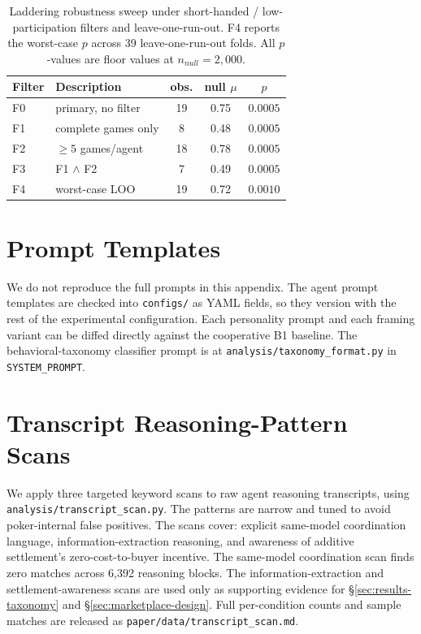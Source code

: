 \documentclass{article}
\begin{document}
\begin{table}[t]
    \centering
    \small
    \caption{Laddering robustness sweep under short-handed / low-participation filters and leave-one-run-out. F4 reports the worst-case $p$ across 39 leave-one-run-out folds. All $p$-values are floor values at $n_{null}{=}2{,}000$.}
    \label{tab:laddering-robustness}
    \begin{tabular}{llccc}
        \toprule
        Filter & Description & obs. & null $\mu$ & $p$ \\
        \midrule
        F0 & primary, no filter & 19 & 0.75 & $0.0005$ \\
        F1 & complete games only & 8 & 0.48 & $0.0005$ \\
        F2 & $\geq 5$ games/agent & 18 & 0.78 & $0.0005$ \\
        F3 & F1 $\wedge$ F2 & 7 & 0.49 & $0.0005$ \\
        F4 & worst-case LOO & 19 & 0.72 & $0.0010$ \\
        \bottomrule
    \end{tabular}
\end{table}

\section{Prompt Templates}
\label{app:prompts}

We do not reproduce the full prompts in this appendix.
The agent prompt templates are checked into \texttt{configs/} as YAML fields, so they version with the rest of the experimental configuration.
Each personality prompt and each framing variant can be diffed directly against the cooperative B1 baseline.
The behavioral-taxonomy classifier prompt is at \texttt{analysis/taxonomy\_format.py} in \texttt{SYSTEM\_PROMPT}.

\section{Transcript Reasoning-Pattern Scans}
\label{app:transcripts}

We apply three targeted keyword scans to raw agent reasoning transcripts, using \texttt{analysis/transcript\_scan.py}.
The patterns are narrow and tuned to avoid poker-internal false positives.
The scans cover: explicit same-model coordination language, information-extraction reasoning, and awareness of additive settlement's zero-cost-to-buyer incentive.
The same-model coordination scan finds zero matches across 6{,}392 reasoning blocks.
The information-extraction and settlement-awareness scans are used only as supporting evidence for \S\ref{sec:results-taxonomy} and \S\ref{sec:marketplace-design}.
Full per-condition counts and sample matches are released as \texttt{paper/data/transcript\_scan.md}.
\end{document}
